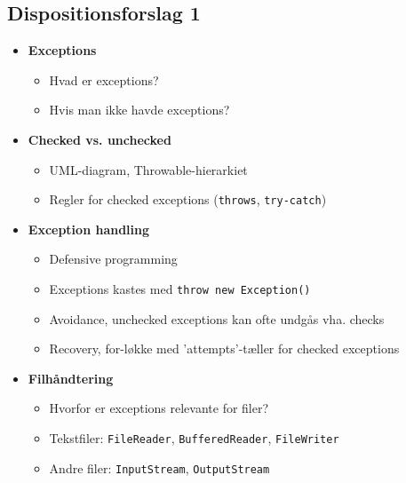 \subsection{Dispositionsforslag 1}

\begin{itemize}
    \item \textbf{Exceptions}
    \begin{itemize}
        \item Hvad er exceptions?
        \item Hvis man ikke havde exceptions?
    \end{itemize}
    
    \item \textbf{Checked vs. unchecked}
    \begin{itemize}
        \item UML-diagram, Throwable-hierarkiet
        \item Regler for checked exceptions (\verb|throws|, \verb|try-catch|)
    \end{itemize}
    
    \item \textbf{Exception handling}
    \begin{itemize}
        \item Defensive programming
        \item Exceptions kastes med \verb|throw new Exception()|
        \item Avoidance, unchecked exceptions kan ofte undgås vha. checks
        \item Recovery, for-løkke med 'attempts'-tæller for checked exceptions
    \end{itemize}
    
    \item \textbf{Filhåndtering}
    \begin{itemize}
        \item Hvorfor er exceptions relevante for filer?
        \item Tekstfiler: \verb|FileReader|, \verb|BufferedReader|, \verb|FileWriter|
        \item Andre filer: \verb|InputStream|, \verb|OutputStream|
    \end{itemize}
    
\end{itemize}
